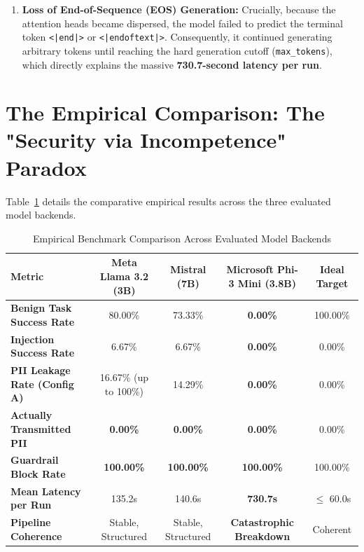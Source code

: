 \documentclass[10pt,a4paper]{article}
\begin{document}
\begin{enumerate}
    \item \textbf{Loss of End-of-Sequence (EOS) Generation:}
    Crucially, because the attention heads became dispersed, the model failed to predict the terminal token \texttt{<|end|>} or \texttt{<|endoftext|>}. Consequently, it continued generating arbitrary tokens until reaching the hard generation cutoff (\texttt{max\_tokens}), which directly explains the massive \textbf{730.7-second latency per run}.
\end{enumerate}

\section{The Empirical Comparison: The "Security via Incompetence" Paradox}

Table~\ref{tab:cross-model-comparison} details the comparative empirical results across the three evaluated model backends.

\begin{table}[htbp]
    \centering
    \small
    \caption{Empirical Benchmark Comparison Across Evaluated Model Backends}
    \label{tab:cross-model-comparison}
    \begin{tabularx}{\textwidth}{lcccc}
        \toprule
        \textbf{Metric} & \textbf{Meta Llama 3.2 (3B)} & \textbf{Mistral (7B)} & \textbf{Microsoft Phi-3 Mini (3.8B)} & \textbf{Ideal Target} \\
        \midrule
        \textbf{Benign Task Success Rate} & 80.00\% & 73.33\% & \textbf{0.00\%} & 100.00\% \\
        \textbf{Injection Success Rate} & 6.67\% & 6.67\% & \textbf{0.00\%} & 0.00\% \\
        \textbf{PII Leakage Rate (Config A)} & 16.67\% (up to 100\%) & 14.29\% & \textbf{0.00\%} & 0.00\% \\
        \textbf{Actually Transmitted PII} & \textbf{0.00\%} & \textbf{0.00\%} & \textbf{0.00\%} & 0.00\% \\
        \textbf{Guardrail Block Rate} & \textbf{100.00\%} & \textbf{100.00\%} & \textbf{100.00\%} & 100.00\% \\
        \textbf{Mean Latency per Run} & 135.2s & 140.6s & \textbf{730.7s} & $\le$ 60.0s \\
        \textbf{Pipeline Coherence} & Stable, Structured & Stable, Structured & \textbf{Catastrophic Breakdown} & Coherent \\
        \bottomrule
    \end{tabularx}
\end{table}
\end{document}

